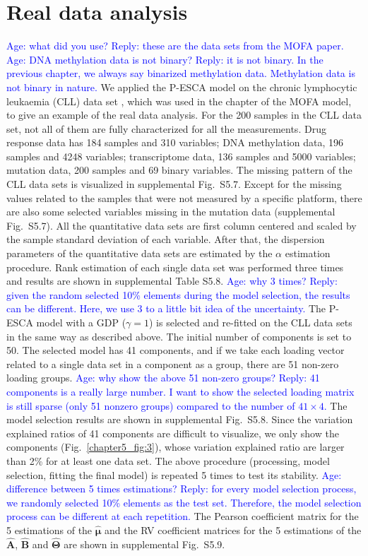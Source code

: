 \section{Real data analysis}
\textcolor{blue}{Age: what did you use? Reply: these are the data sets from the MOFA paper.}
\textcolor{blue}{Age: DNA methylation data is not binary? Reply: it is not binary. In the previous chapter, we always say binarized methylation data. Methylation data is not binary in nature.}
We applied the P-ESCA model on the chronic lymphocytic leukaemia (CLL) data set \cite{dietrich2018drug,argelaguet2018multi}, which was used in the chapter of the MOFA model, to give an example of the real data analysis. For the 200 samples in the CLL data set, not all of them are fully characterized for all the measurements. Drug response data has 184 samples and 310 variables; DNA methylation data, 196 samples and 4248 variables; transcriptome data, 136 samples and 5000 variables; mutation data, 200 samples and 69 binary variables. The missing pattern of the CLL data sets is visualized in supplemental Fig.~S5.7. Except for the missing values related to the samples that were not measured by a specific platform, there are also some selected variables missing in the mutation data (supplemental Fig.~S5.7). All the quantitative data sets are first column centered and scaled by the sample standard deviation of each variable. After that, the dispersion parameters of the quantitative data sets are estimated by the $\alpha$ estimation procedure. Rank estimation of each single data set was performed three times and results are shown in supplemental Table S5.8. \textcolor{blue}{Age: why 3 times? Reply: given the random selected 10\% elements during the model selection, the results can be different. Here, we use 3 to a little bit idea of the uncertainty.} The P-ESCA model with a GDP ($\gamma=1$) is selected and re-fitted on the CLL data sets in the same way as described above. The initial number of components is set to 50. The selected model has 41 components, and if we take each loading vector related to a single data set in a component as a group, there are 51 non-zero loading groups. \textcolor{blue}{Age: why show the above 51 non-zero groups? Reply: 41 components is a really large number. I want to show the selected loading matrix is still sparse (only 51 nonzero groups) compared to the number of $41 \times 4$.} The model selection results are shown in supplemental Fig.~S5.8. Since the variation explained ratios of 41 components are difficult to visualize, we only show the components (Fig.~\ref{chapter5_fig:3}), whose variation explained ratio are larger than 2\% for at least one data set. The above procedure (processing, model selection, fitting the final model) is repeated 5 times to test its stability. \textcolor{blue}{Age: difference between 5 times estimations? Reply: for every model selection process, we randomly selected 10\% elements as the test set. Therefore, the model selection process can be different at each repetition.} The Pearson coefficient matrix for the 5 estimations of the $\hat{\bm{\mu}}$ and the RV coefficient matrices for the 5 estimations of the $\hat{\mathbf{A}}$, $\hat{\mathbf{B}}$ and $\hat{\mathbf{\Theta}}$ are shown in supplemental Fig.~S5.9.

